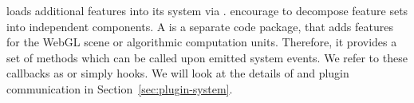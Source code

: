 \documentclass[../../ClassicThesis.tex]{subfiles}
\begin{document}
{\convertify} loads additional features into its system via
.  encourage to decompose
feature sets into independent components. A 
is a separate code package, that adds features for the WebGL
scene or algorithmic computation units. Therefore, it
provides a set of methods which can be called upon emitted
system events. We refer to these callbacks as
 or simply hooks. We will look at the
details of  and plugin communication in
Section~\ref{sec:plugin-system}.








\end{document}
